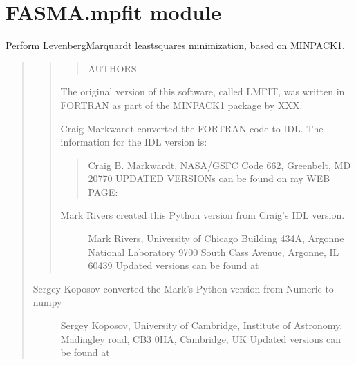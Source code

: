 \documentclass[letterpaper,10pt,english]{sphinxmanual}
\begin{document}
\section{FASMA.mpfit module}
\label{\detokenize{index:module-FASMA.mpfit}}\label{\detokenize{index:fasma-mpfit-module}}
Perform Levenberg\sphinxhyphen{}Marquardt least\sphinxhyphen{}squares minimization, based on MINPACK\sphinxhyphen{}1.
\begin{quote}
\begin{quote}
\begin{quote}

AUTHORS
\end{quote}

The original version of this software, called LMFIT, was written in FORTRAN
as part of the MINPACK\sphinxhyphen{}1 package by XXX.

Craig Markwardt converted the FORTRAN code to IDL.  The information for the
IDL version is:
\begin{quote}

Craig B. Markwardt, NASA/GSFC Code 662, Greenbelt, MD 20770
UPDATED VERSIONs can be found on my WEB PAGE:
\begin{quote}

\end{quote}
\end{quote}
\begin{description}
\item[{Mark Rivers created this Python version from Craig’s IDL version.}] \leavevmode
Mark Rivers, University of Chicago
Building 434A, Argonne National Laboratory
9700 South Cass Avenue, Argonne, IL 60439
Updated versions can be found at 

\end{description}
\end{quote}
\begin{description}
\item[{Sergey Koposov converted the Mark’s Python version from Numeric to numpy}] \leavevmode
Sergey Koposov, University of Cambridge, Institute of Astronomy,
Madingley road, CB3 0HA, Cambridge, UK
Updated versions can be found at 
\begin{quote}


\end{quote}
\end{description}
\end{quote}
\end{document}
